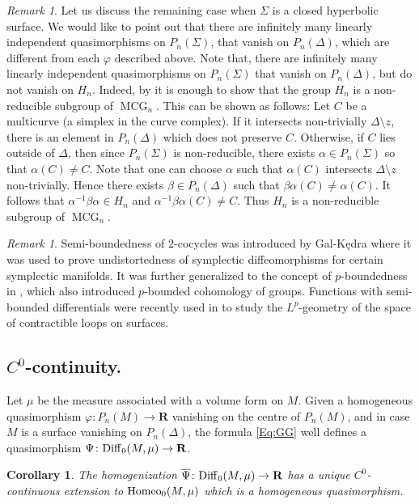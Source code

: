 \documentclass[11pt]{amsart}
\newtheorem{corollary}[subsection]{Corollary}
\theoremstyle{definition}
\theoremstyle{remark}
\newtheorem{remark}[subsection]{Remark}
\numberwithin{equation}{section}
\numberwithin{figure}{section}
\newcommand{\B}[1]{{\mathbf #1}}
\begin{document}
\begin{remark}
Let us discuss the remaining case when $\Sigma$ is a closed hyperbolic surface.
We would like to point out that there are infinitely many linearly independent quasimorphisms on $P_n(\Sigma)$, that vanish 
on $P_n(\Delta)$, which are different from each $\varphi$ described above.
Note that, there are infinitely many linearly independent quasimorphisms on 
$P_n(\Sigma)$ that vanish on $P_n(\Delta)$, but do not vanish on $H_n$. 
Indeed, by  \cite[Theorem 12]{zbMATH01928904} it is enough to show that the group $H_n$ 
is a non-reducible subgroup of $\operatorname{MCG}_n$. This can be shown as follows:
Let $C$ be a multicurve (a simplex in the curve complex). If it intersects non-trivially 
$\Delta\setminus z$, there is an element in $P_n(\Delta)$ which does not preserve $C$.
Otherwise, if $C$ lies outside of $\Delta$, then since $P_n(\Sigma)$ is non-reducible, there exists 
$\alpha\in P_n(\Sigma)$ so that $\alpha(C)\neq C$. Note that one can choose $\alpha$ such that $\alpha(C)$ intersects
$\Delta\setminus z$ non-trivially. Hence there exists $\beta\in P_n(\Delta)$ such that $\beta\alpha(C)\neq\alpha(C)$. It follows 
that $\alpha^{-1}\beta\alpha\in H_n$ and $\alpha^{-1}\beta\alpha(C)\neq C$. 
Thus $H_n$ is a non-reducible subgroup of $\operatorname{MCG}_n$.
\end{remark}

\begin{remark}
Semi-boundedness of $2$-cocycles was introduced by Gal-Kędra
\cite{zbMATH06065373} where it was used to prove undistortedness of symplectic
diffeomorphisms for certain symplectic manifolds. It was further generalized to
the concept of $p$-boundedness in \cite{arXiv:2208.03168}, which also
introduced $p$-bounded cohomology of groups. Functions with semi-bounded differentials were recently used in \cite{BS-equators} to study the $L^p$-geometry of the space of contractible loops on surfaces.
\end{remark}


\subsection*{\texorpdfstring{$C^0$}{C0}-continuity.}
Let $\mu$ be the measure associated with a volume form on $M$.
Given a homogeneous quasimorphism 
$\varphi \colon P_n(M)\to \B R$ vanishing
on the centre of $P_n(M)$, and in case $M$ is a surface vanishing on $P_n(\Delta)$, 
the formula \eqref{Eq:GG} well defines a
quasimorphism $\Psi\colon {\rm Diff}_0(M,{\mu})\to \B R$.

\begin{corollary}\label{C:c0-extension}
The homogenization $\overline{\Psi}\colon {\rm Diff}_0(M,{\rm \mu}) \to \B R$
has a unique $C^0$-continuous extension to 
${\rm Homeo}_0(M,\mu)$ which is a homogeneous quasimorphism.
\end{corollary}
\end{document}
